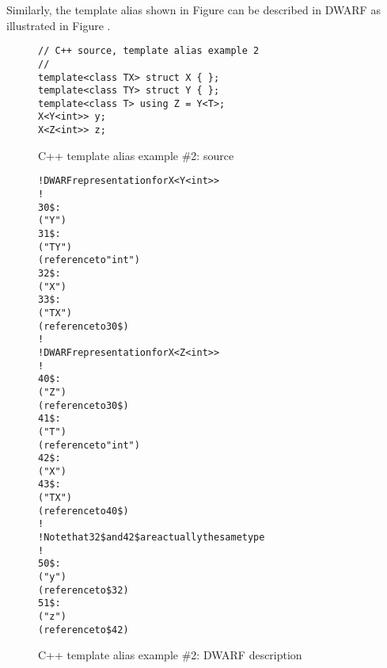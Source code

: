 Similarly, the  template alias shown in
Figure 
can be described in DWARF as illustrated 
 in 
Figure .

\begin{figure}[h]
\begin{lstlisting}
// C++ source, template alias example 2
//
template<class TX> struct X { };
template<class TY> struct Y { };
template<class T> using Z = Y<T>;
X<Y<int>> y;
X<Z<int>> z;
\end{lstlisting}
\caption{C++ template alias example \#2: source}
\label{fig:ctemplatealiasexample2source}
\end{figure}

\begin{figure}[h]
\begin{dwflisting}
\begin{alltt}
! DWARF representation for X<Y<int>>
!
30\$:  \DWTAGstructuretype
          \DWATname("Y")
31\$:      \DWTAGtemplatetypeparameter
              \DWATname("TY")
              \DWATtype(reference to "int")
32\$:  \DWTAGstructuretype
          \DWATname("X")
33\$:      \DWTAGtemplatetypeparameter
              \DWATname("TX")
              \DWATtype(reference to 30\$)
!
! DWARF representation for X<Z<int>>
!
40\$:  \DWTAGtemplatealias
          \DWATname("Z")
          \DWATtype(reference to 30\$)
41\$:      \DWTAGtemplatetypeparameter
              \DWATname("T")
              \DWATtype(reference to "int")
42\$:  \DWTAGstructuretype
          \DWATname("X")
43\$:      \DWTAGtemplatetypeparameter
              \DWATname("TX")
              \DWATtype(reference to 40\$)
!
! Note that 32\$ and 42\$ are actually the same type
!
50\$:  \DWTAGvariable
          \DWATname("y")
          \DWATtype(reference to \$32)
51\$:  \DWTAGvariable
          \DWATname("z")
          \DWATtype(reference to \$42)
\end{alltt}
\end{dwflisting}
\caption{C++ template alias example \#2: DWARF description}
\label{fig:ctemplatealiasexample2dwarf}
\end{figure}

\clearpage
